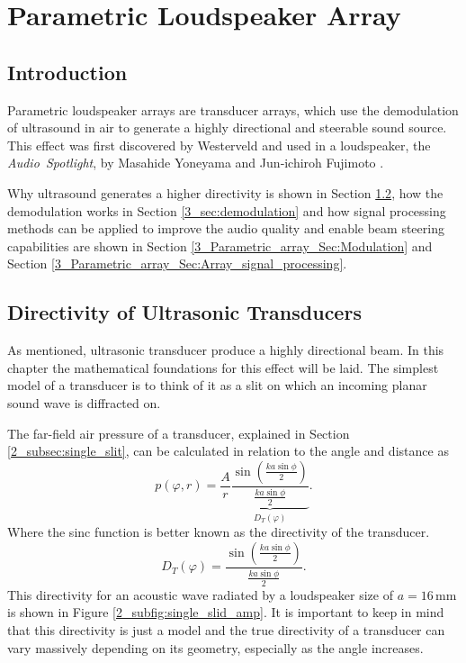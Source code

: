 \chapter{Parametric Loudspeaker Array}
\section{Introduction}
Parametric loudspeaker arrays are transducer arrays, which use the demodulation of ultrasound in air to generate a highly directional and steerable sound source. This effect was first discovered by Westerveld \cite{doi:10.1121/1.1918525} and used in a loudspeaker, the \mbox{\textit{Audio Spotlight}}, by Masahide Yoneyama and Jun‐ichiroh Fujimoto \cite{doi:10.1121/1.389414}.

Why ultrasound generates a higher directivity is shown in Section \ref{3_sec:directivity}, how the demodulation works in Section \ref{3_sec:demodulation} and how signal processing methods can be applied to improve the audio quality and enable beam steering capabilities are shown in Section \ref{3_Parametric_array_Sec:Modulation} and Section \ref{3_Parametric_array_Sec:Array_signal_processing}.
\section{Directivity of Ultrasonic Transducers}\label{3_sec:directivity}
As mentioned, ultrasonic transducer produce a highly directional beam. In this chapter the mathematical foundations for this effect will be laid. 
The simplest model of a transducer is to think of it as a slit on which an incoming planar sound wave is diffracted on.\cite{alma99116706330905515} 

The far-field air pressure of a transducer, explained in Section \ref{2_subsec:single_slit}, can be calculated in relation to the angle and distance as 
\begin{equation}
    p(\varphi,r) 
    = 
    \frac{A}{r} \underbrace{\frac{\sin \left ( \frac{ka \sin \phi}{2}\right )}{ \frac{ka \sin \phi}{2}}}_{D_T(\varphi)}.
\end{equation}
Where the sinc function is better known as the directivity of the transducer.
\begin{equation}
    D_T(\varphi) = \frac{\sin \left ( \frac{ka \sin \phi}{2}\right )}{ \frac{ka \sin \phi}{2}}.
\end{equation}
This directivity for an acoustic wave radiated by a loudspeaker size of $a = 16 \, \text{mm}$ is shown in Figure \ref{2_subfig:single_slid_amp}. 
It is important to keep in mind that this directivity is just a model and the true directivity of a transducer can vary massively depending on its geometry, especially as the angle increases.

